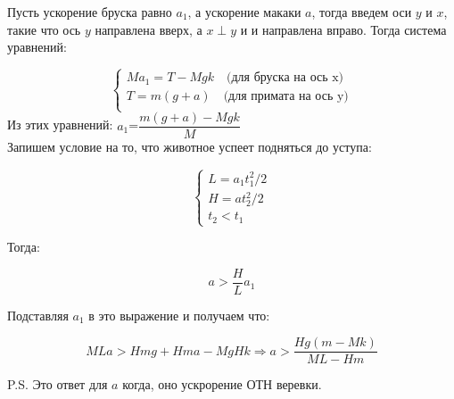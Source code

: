 \documentclass{report}
\begin{document}




\sol Пусть ускорение бруска равно $a_1$, а ускорение макаки $a$, тогда введем оси $y$ и $x$, такие что ось $y$ направлена вверх, а $x \perp y$ и и направлена вправо. Тогда система уравнений: 

\begin{equation}
\begin{cases}
	Ma_1=T-Mgk  \quad \text{(для бруска на ось x)}\\
	T=m(g+a)  \quad \text{(для примата на ось y)}\\
\end{cases}
\end{equation}
Из этих уравнений: $a_1$=$\dfrac{m(g+a)-Mgk}{M}$\\
Запишем условие на то, что животное успеет подняться до уступа:
\begin{center}
\begin{equation}
\begin{cases}
L=a_1t_1^2/2\\
H=at_2^2/2\\
t_2<t_1
\end{cases}
\end{equation}
\end{center}
Тогда:
\begin{center}
\begin{equation}
	a>\frac{H}{L}a_1
\end{equation}
\end{center}

Подставляя $a_1$ в это выражение и получаем что: 

\begin{center}
\begin{equation}
	MLa>Hmg+Hma-MgHk \Rightarrow a>\dfrac{Hg(m-Mk)}{ML-Hm}
\end{equation}
\end{center}

P.S. Это ответ для $a$ когда, оно ускрорение ОТН веревки.
\end{document}
